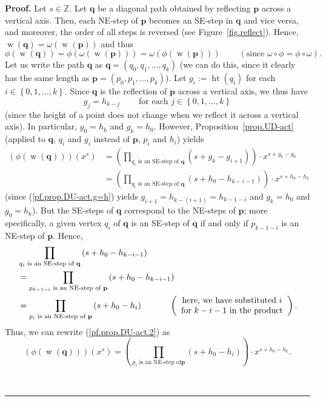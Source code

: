 \documentclass[numbers=enddot,12pt,final,onecolumn,notitlepage]{scrartcl}%
\theoremstyle{definition}
\newenvironment{proof}[1][Proof]{\noindent\textbf{#1.} }{\ \rule{0.5em}{0.5em}}
\newcommand{\ZZ}{\mathbb{Z}}
\newcommand{\pp}{\mathbf{p}}
\newcommand{\qq}{\mathbf{q}}
\newcommand{\w}{\operatorname{w}}
\newcommand{\htt}{\operatorname{ht}}
\newenvironment{verlong}{}{}
\begin{document}
\begin{verlong}
\begin{proof}
Let $s\in\ZZ$. Let $\qq$ be a diagonal path obtained by
reflecting $\pp$ across a vertical axis. Then, each NE-step of
$\pp$ becomes an SE-step in $\qq$ and vice versa, and moreover,
the order of all steps is reversed
(see Figure~\ref{fig.reflect}). Hence, $\w\left(
\qq\right)  =\omega\left(  \w\left(  \pp\right)
\right)  $ and thus
\[
\phi\left(  \w\left(  \qq\right)  \right)  =\phi\left(
\omega\left(  \w\left(  \pp\right)  \right)  \right)  =\omega\left(
\phi\left(  \w\left(  \pp\right)  \right)  \right)
\ \ \ \ \ \ \ \ \ \ \left(  \text{since }\omega\circ\phi=\phi\circ
\omega\right)  .
\]
Let us write the path $\qq$ as $\qq=\left(  q_{0},q_{1}%
,\ldots,q_{k}\right)  $ (we can do this, since it clearly has the same length
as $\pp=\left(  p_{0},p_{1},\ldots,p_{k}\right)  $). Let $g_{i}%
:=\htt\left(  q_{i}\right)  $ for each $i\in\left\{
0,1,\ldots,k\right\}  $. Since $\qq$ is the reflection of $\pp$
across a vertical axis, we thus have
\begin{equation}
g_{j}=h_{k-j}\ \ \ \ \ \ \ \ \ \ \text{for each }j\in\left\{  0,1,\ldots
,k\right\}  \label{pf.prop.DU-act.g=h}%
\end{equation}
(since the height of a point does not change when we reflect it across a
vertical axis). In particular, $g_{0}=h_{k}$ and $g_k=h_{0}$. However,
Proposition~\ref{prop.UD-act} (applied to $\qq$, $q_{i}$ and $g_{i}$
instead of $\pp$, $p_{i}$ and $h_{i}$) yields%
\begin{align}
\left(  \phi\left(  \w\left(  \qq\right)  \right)
\right)  \left(  x^{s}\right)   &  =\left(  \prod_{q_{i}\text{ is an SE-step
of }\qq}\left(  s+g_k-g_{i+1}\right)  \right)  \cdot x^{s+g_k-g_{0}}\nonumber\\
&  =\left(  \prod_{q_{i}\text{ is an SE-step of }\qq}\left(
s+h_{0}-h_{k-i-1}\right)  \right)  \cdot x^{s+h_{0}-h_{k}}%
\label{pf.prop.DU-act.2}%
\end{align}
(since (\ref{pf.prop.DU-act.g=h}) yields $g_{i+1}=h_{k-\left(  i+1\right)
}=h_{k-1-i}$ and $g_k=h_{0}$ and $g_{0}=h_{k}$). But the SE-steps of
$\qq$ correspond to the NE-steps of $\pp$; more specifically, a
given vertex $q_{i}$ of $\qq$ is an  SE-step of $\qq$ if and
only if $p_{k-1-i}$ is an NE-step of $\pp$. Hence,
\begin{align*}
& \prod_{q_{i}\text{ is an SE-step of }\qq}\left(  s+h_{0}%
-h_{k-i-1}\right)  \\
& =\prod_{p_{k-1-i}\text{ is an NE-step of }\pp}\left(  s+h_{0}%
-h_{k-i-1}\right)  \\
& =\prod_{p_{i}\text{ is an NE-step of }\pp}\left(  s+h_{0}%
-h_{i}\right)  \ \ \ \ \ \ \ \ \ \ \left(
\begin{array}
[c]{c}%
\text{here, we have substituted }i\\
\text{for }k-i-1\text{ in the product}%
\end{array}
\right)  .
\end{align*}
Thus, we can rewrite (\ref{pf.prop.DU-act.2}) as%
\[
\left(  \phi\left(  \w\left(  \qq\right)  \right)
\right)  \left(  x^{s}\right)  =\left(  \prod_{p_{i}\text{ is an NE-step of
}\pp}\left(  s+h_{0}-h_{i}\right)  \right)  \cdot x^{s+h_{0}-h_{k}}.
\]



\end{proof}
\end{verlong}
\end{document}
